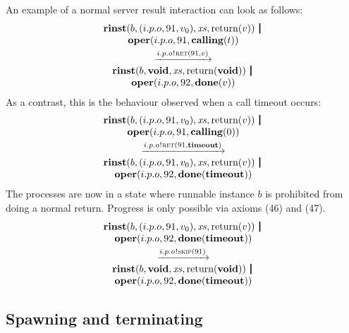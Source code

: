\documentclass[twocolumn]{article}
\begin{document}
An example of a normal server result interaction can look as follows:
$$
\begin{array}{c}
  {\Trinst b {\Tclient {i.p.o} {91} {v_0}} \Xs {\Treturn v}} \,\Opar  \\
  {\Toper {i.p.o} {91} {\Tcalling t}} \vspace{0.6ex} \\
  \red{\say{i.p.o}{\Tret {91} v}} \\
  {\Trinst b \Tvoid \Xs {\Treturn \Tvoid}} \,\Opar \\
  {\Toper {i.p.o} {92} {\Tdone v}}
\end{array}
$$
As a contrast, this is the behaviour observed when a call timeout occurs:
$$
\begin{array}{c}
  {\Trinst b {\Tclient {i.p.o} {91} {v_0}} \Xs {\Treturn v}} \,\Opar  \\
  {\Toper {i.p.o} {91} {\Tcalling 0}} \vspace{0.6ex} \\
  \red{\say{i.p.o}{\Tret {91} \Ttimeout}} \\
  {\Trinst b {\Tclient {i.p.o} {91} {v_0}} \Xs {\Treturn v}} \,\Opar  \\
  {\Toper {i.p.o} {92} {\Tdone \Ttimeout}}
\end{array}
$$
The processes are now in a state where runnable instance $b$ is prohibited from doing a normal return. Progress is only possible via axioms (46) and (47).
$$
\begin{array}{c}
  {\Trinst b {\Tclient {i.p.o} {91} {v_0}} \Xs {\Treturn v}} \,\Opar  \\
  {\Toper {i.p.o} {92} {\Tdone \Ttimeout}} \vspace{0.6ex} \\
  \red{\say{i.p.o}{\Tskip {91}}} \\
  {\Trinst b \Tvoid \Xs {\Treturn \Tvoid}} \,\Opar \\
  {\Toper {i.p.o} {92} {\Tdone \Ttimeout}}
\end{array}
$$


\subsection{Spawning and terminating} \label{sect:SpawnTerm}
\end{document}
